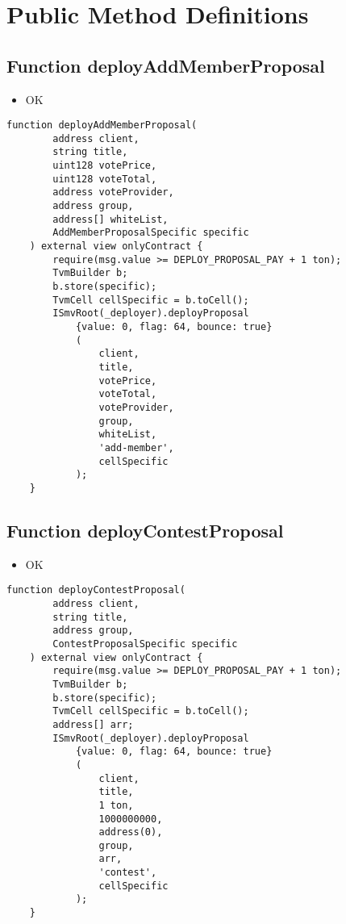 \section{Public Method Definitions}


\subsection{Function deployAddMemberProposal}

\begin{itemize}
\item OK
\end{itemize}

\begin{lstlisting}[firstnumber=75]
    function deployAddMemberProposal(
        address client,
        string title,
        uint128 votePrice,
        uint128 voteTotal,
        address voteProvider,
        address group,
        address[] whiteList,
        AddMemberProposalSpecific specific
    ) external view onlyContract {
        require(msg.value >= DEPLOY_PROPOSAL_PAY + 1 ton);
        TvmBuilder b;
        b.store(specific);
        TvmCell cellSpecific = b.toCell();
        ISmvRoot(_deployer).deployProposal
            {value: 0, flag: 64, bounce: true}
            (
                client,
                title,
                votePrice,
                voteTotal,
                voteProvider,
                group,
                whiteList,
                'add-member',
                cellSpecific
            );
    }
\end{lstlisting}

\subsection{Function deployContestProposal}

\begin{itemize}
\item OK
\end{itemize}

\begin{lstlisting}[firstnumber=20]
    function deployContestProposal(
        address client,
        string title,
        address group,
        ContestProposalSpecific specific
    ) external view onlyContract {
        require(msg.value >= DEPLOY_PROPOSAL_PAY + 1 ton);
        TvmBuilder b;
        b.store(specific);
        TvmCell cellSpecific = b.toCell();
        address[] arr;
        ISmvRoot(_deployer).deployProposal
            {value: 0, flag: 64, bounce: true}
            (
                client,
                title,
                1 ton,
                1000000000,
                address(0),
                group,
                arr,
                'contest',
                cellSpecific
            );
    }
\end{lstlisting}

